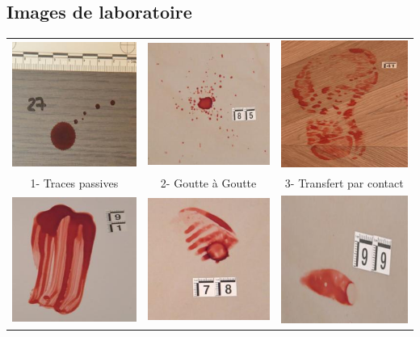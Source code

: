 \documentclass[a4paper]{article}
\begin{document}
\begin{appendices}

\section{Images de laboratoire}
\label{sec: annexe}

\begin{table}[H]
    \centering
    \begin{tabular}{ccc}
        \includegraphics[width=0.20\linewidth]{../asset/data_labo/1_bois_350.jpg} & \includegraphics[width=0.20\linewidth]{../asset/data_labo/2_carrelage_523.jpg}& \includegraphics[width=0.20\linewidth]{../asset/data_labo/3_lino_888.jpg} \\
        1- Traces passives & 2- Goutte à Goutte & 3- Transfert par contact \\
        \includegraphics[width=0.20\linewidth]{../asset/data_labo/4_papier_1586.jpg} & \includegraphics[width=0.20\linewidth]{../asset/data_labo/5_carrelage_5605.jpg} & \includegraphics[width=0.20\linewidth]{../asset/data_labo/6_bois_604.jpg} \\

\end{tabular}
\end{table}
\end{appendices}
\end{document}
